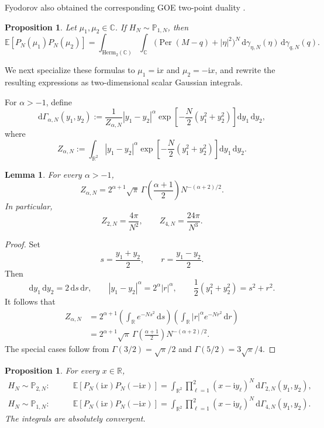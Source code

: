 \documentclass[11pt,reqno]{amsart}
\numberwithin{equation}{section}
\newtheorem{proposition}[theorem]{Proposition}
\newtheorem{lemma}[theorem]{Lemma}
\theoremstyle{definition}
\theoremstyle{remark}
\DeclareMathOperator{\Per}{Per}
\newcommand{\E}{\mathbb E}
\newcommand{\Pp}{\mathbb P}
\newcommand{\R}{\mathbb R}
\newcommand{\C}{\mathbb C}
\newcommand{\1}{\mathbf 1}
\newcommand{\dd}{\mathrm d}
\newcommand{\ii}{\mathrm i}
\newcommand{\Herm}{\mathrm{Herm}}
\begin{document}
Fyodorov also obtained the corresponding GOE two-point duality
\cite[Eqs.~(7.7)--(7.9)]{Fyodorov2006}.   
\begin{proposition} 
Let \(\mu_1,\mu_2\in\C\).  If \(H_N\sim\Pp_{1,N}\), then
\begin{equation}\label{eq:GOE-per-duality}
  \E[P_N(\mu_1)P_N(\mu_2)]
  =
  \int_{\Herm_2(\C)}\int_{\C}
  \bigl(\Per(M-q)+|\eta|^2\bigr)^N
  \,\dd\gamma_{\eta,N}(\eta)\,\dd\gamma_{q,N}(q).
\end{equation}
\end{proposition}

We next specialize these formulas to \(\mu_1=\ii x\) and
\(\mu_2=-\ii x\), and rewrite the resulting expressions as two-dimensional
scalar Gaussian integrals.

For \(\alpha>-1\), define
\[
  \dd\Gamma_{\alpha,N}(y_1,y_2)
  :=
  \frac{1}{Z_{\alpha,N}}
  |y_1-y_2|^\alpha
  \exp\!\left[-\frac N2(y_1^2+y_2^2)\right]
  \dd y_1\,\dd y_2,
\]
where
\[
  Z_{\alpha,N}
  :=
  \int_{\R^2}|y_1-y_2|^\alpha
  \exp\!\left[-\frac N2(y_1^2+y_2^2)\right]
  \dd y_1\,\dd y_2.
\]

\begin{lemma}\label{lem:Z-alpha}
For every \(\alpha>-1\),
\[
  Z_{\alpha,N}
  =
  2^{\alpha+1}\sqrt\pi\,
  \Gamma\!\left(\frac{\alpha+1}{2}\right)
  N^{-(\alpha+2)/2}.
\]
In particular,
\[
  Z_{2,N}=\frac{4\pi}{N^2},
  \qquad
  Z_{4,N}=\frac{24\pi}{N^3}.
\]
\end{lemma}

\begin{proof}
Set
\[
  s=\frac{y_1+y_2}{2},
  \qquad
  r=\frac{y_1-y_2}{2}.
\]
Then
\[
  \dd y_1\,\dd y_2=2\,\dd s\,\dd r,
  \qquad
  |y_1-y_2|^\alpha=2^\alpha|r|^\alpha,
  \qquad
  \frac12(y_1^2+y_2^2)=s^2+r^2.
\]
It follows that
\begin{align*}
  Z_{\alpha,N}
  &=
  2^{\alpha+1}
  \left(\int_{\R}e^{-Ns^2}\,\dd s\right)
  \left(\int_{\R}|r|^\alpha e^{-Nr^2}\,\dd r\right)\\
  &=
  2^{\alpha+1}\sqrt\pi\,
  \Gamma\!\left(\frac{\alpha+1}{2}\right)
  N^{-(\alpha+2)/2}.
\end{align*}
The special cases follow from
\(
  \Gamma(3/2)=\sqrt\pi/2
\)
and
\(
  \Gamma(5/2)=3\sqrt\pi/4.
\)
\end{proof}

\begin{proposition}\label{prop:scalar-permanent-duality}
For every \(x\in\R\),
\begin{align}
  H_N\sim\Pp_{2,N}:\qquad
  &\E[P_N(\ii x)P_N(-\ii x)]
  =
  \int_{\R^2}
  \prod_{\ell=1}^2(x-\ii y_\ell)^N
  \,\dd\Gamma_{2,N}(y_1,y_2),
  \label{eq:GUE-per-scalar}\\
  H_N\sim\Pp_{1,N}:\qquad
  &\E[P_N(\ii x)P_N(-\ii x)]
  =
  \int_{\R^2}
  \prod_{\ell=1}^2(x-\ii y_\ell)^N
  \,\dd\Gamma_{4,N}(y_1,y_2).
  \label{eq:GOE-per-scalar}
\end{align}
The integrals are absolutely convergent.
\end{proposition}
\end{document}

